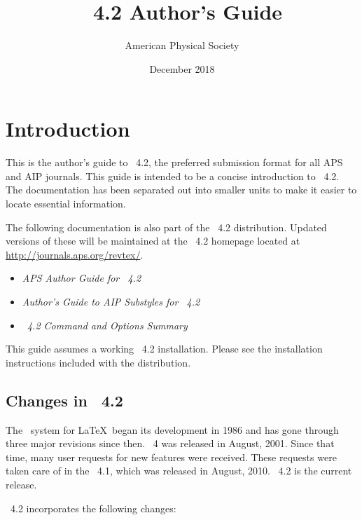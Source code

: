\documentclass[%
,aps%
 ,twocolumn%
 ,secnumarabic%
,amssymb, amsmath,nobibnotes, aps, prl, floatfix]{revtex4-2}
\begin{document}
\title{\revtex~4.2 Author's Guide}%
\author{American Physical Society}%
\date{December 2018}%
\maketitle
\tableofcontents
\clearpage
\section{Introduction}

This is the author's guide to \revtex~4.2, the preferred submission
format for all APS and AIP journals. This guide is intended to be a concise
introduction to \revtex~4.2. The documentation has been separated out
into smaller units to make it easier to locate essential
information.

The following documentation is also part of the \revtex~4.2
distribution. Updated versions of these will be maintained at
the \revtex~4.2 homepage located at \url{http://journals.aps.org/revtex/}.
\begin{itemize}
\item \textit{APS Author Guide for \revtex~4.2}
\item \textit{Author's Guide to AIP Substyles for \revtex~4.2}
\item \textit{\revtex~4.2 Command and Options Summary}
\end{itemize}
This guide assumes a working \revtex~4.2
installation. Please see the installation instructions included with the
distribution.
\subsection{Changes in \revtex~4.2}
The \revtex\ system for \LaTeX\ began its development in 1986 and has gone through three major revisions since then.  \revtex~4 was released in August, 2001. Since that time, many user requests for new features were received. These requests were taken care of in the \revtex~4.1, which was released in August, 2010. \revtex~4.2 is the current release.

\revtex~4.2 incorporates the following changes:
\end{document}
